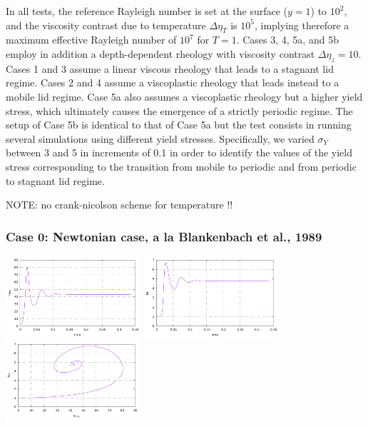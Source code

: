 In all tests, the reference Rayleigh number is set at the surface ($y=1$) to $10^2$, and the viscosity contrast due to temperature $\Delta\eta_T$ is $10^5$, implying therefore a maximum effective Rayleigh number of $10^7$ for $T=1$. Cases 3, 4, 5a, and 5b employ in addition a depth-dependent rheology with viscosity contrast  $\Delta\eta_z=10$. Cases 1 and 3 assume a linear viscous rheology that leads to a stagnant lid regime. Cases 2 and 4 assume a viscoplastic rheology that leads instead to a mobile lid regime. Case 5a also assumes a viscoplastic rheology but a higher yield stress, which ultimately causes the emergence of a strictly periodic regime. The setup of Case 5b is identical to that of Case 5a but the test consists in running several simulations using different yield stresses. Specifically, we varied $\sigma_Y$ between 3 and 5 in increments of 0.1 in order to identify the values of the yield stress corresponding to the transition from mobile to periodic and from periodic to stagnant lid regime. 

NOTE: no crank-nicolson scheme for temperature !!

\subsubsection*{Case 0: Newtonian case, a la Blankenbach et al., 1989}

\includegraphics[width=5cm]{python_codes/fieldstone_28/results_case0/vrms.pdf}
\includegraphics[width=5cm]{python_codes/fieldstone_28/results_case0/Nu.pdf}
\includegraphics[width=5cm]{python_codes/fieldstone_28/results_case0/vrms_Nu.pdf}

